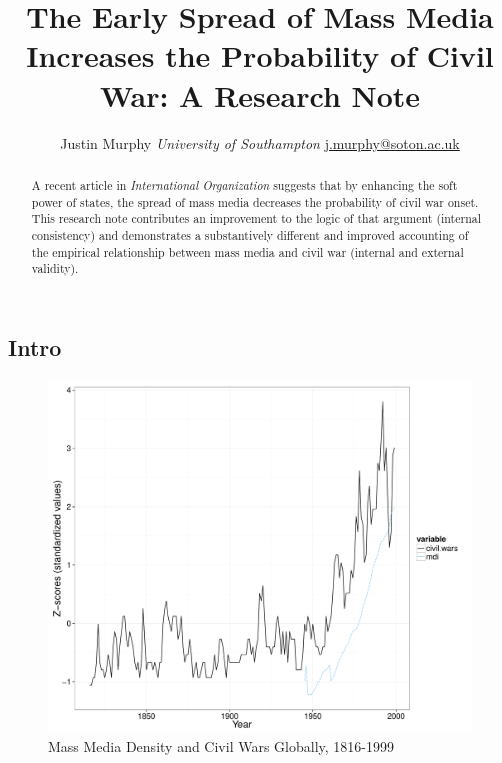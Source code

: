 \documentclass[11pt,article,oneside]{memoir}
\title{The Early Spread of Mass Media Increases the Probability of Civil War: A
Research Note}
\author{\Large Justin Murphy\vspace{0.05in} \newline\normalsize\emph{University of Southampton} \newline\footnotesize \url{j.murphy@soton.ac.uk}\vspace*{0.2in}\newline }
\date{}
\makeatletter
\def\maxwidth{\ifdim\Gin@nat@width>\linewidth\linewidth
\else\Gin@nat@width\fi}
\let\Oldincludegraphics\includegraphics
\renewcommand{\includegraphics}[1]{\Oldincludegraphics[width=\maxwidth]{#1}}
\makeatother
\begin{document}
  
\setsansfont[Mapping=tex-text]{Gill Sans} 
\setmonofont[Mapping=tex-text,Scale=0.8]{Consolas}
\pagestyle{kjh}

\singlespacing


\maketitle



\vspace{-4ex}
\begin{abstract}

\noindent A recent article in \emph{International Organization} suggests that by
enhancing the soft power of states, the spread of mass media decreases
the probability of civil war onset. This research note contributes an
improvement to the logic of that argument (internal consistency) and
demonstrates a substantively different and improved accounting of the
empirical relationship between mass media and civil war (internal and
external validity).

\end{abstract}

\newpage


\onehalfspacing

\subsection{Intro}\label{intro}

\begin{figure}[htbp]
\centering
\includegraphics{figure/globalplot.pdf}
\caption{Mass Media Density and Civil Wars Globally, 1816-1999}
\end{figure}
\end{document}

